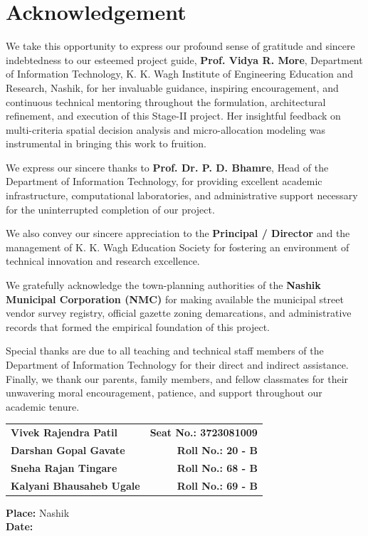 \chapter*{Acknowledgement}
\label{ch:acknowledgement}

We take this opportunity to express our profound sense of gratitude and sincere indebtedness to our esteemed project guide, \textbf{Prof. Vidya R. More}, Department of Information Technology, K. K. Wagh Institute of Engineering Education and Research, Nashik, for her invaluable guidance, inspiring encouragement, and continuous technical mentoring throughout the formulation, architectural refinement, and execution of this Stage-II project. Her insightful feedback on multi-criteria spatial decision analysis and micro-allocation modeling was instrumental in bringing this work to fruition.

We express our sincere thanks to \textbf{Prof. Dr. P. D. Bhamre}, Head of the Department of Information Technology, for providing excellent academic infrastructure, computational laboratories, and administrative support necessary for the uninterrupted completion of our project.

We also convey our sincere appreciation to the \textbf{Principal / Director} and the management of K. K. Wagh Education Society for fostering an environment of technical innovation and research excellence.

We gratefully acknowledge the town-planning authorities of the \textbf{Nashik Municipal Corporation (NMC)} for making available the municipal street vendor survey registry, official gazette zoning demarcations, and administrative records that formed the empirical foundation of this project.

Special thanks are due to all teaching and technical staff members of the Department of Information Technology for their direct and indirect assistance. Finally, we thank our parents, family members, and fellow classmates for their unwavering moral encouragement, patience, and support throughout our academic tenure.

\vspace{1.5cm}

\noindent
\begin{tabular*}{\textwidth}{@{\extracolsep{\fill}}lr}
    \textbf{Vivek Rajendra Patil} & \textbf{Seat No.: 3723081009} \\
    \textbf{Darshan Gopal Gavate} & \textbf{Roll No.: 20 - B} \\
    \textbf{Sneha Rajan Tingare} & \textbf{Roll No.: 68 - B} \\
    \textbf{Kalyani Bhausaheb Ugale} & \textbf{Roll No.: 69 - B} \\
\end{tabular*}

\vspace{1.0cm}
\noindent \textbf{Place:} Nashik \\
\textbf{Date:} \underline{\hspace{3cm}}
